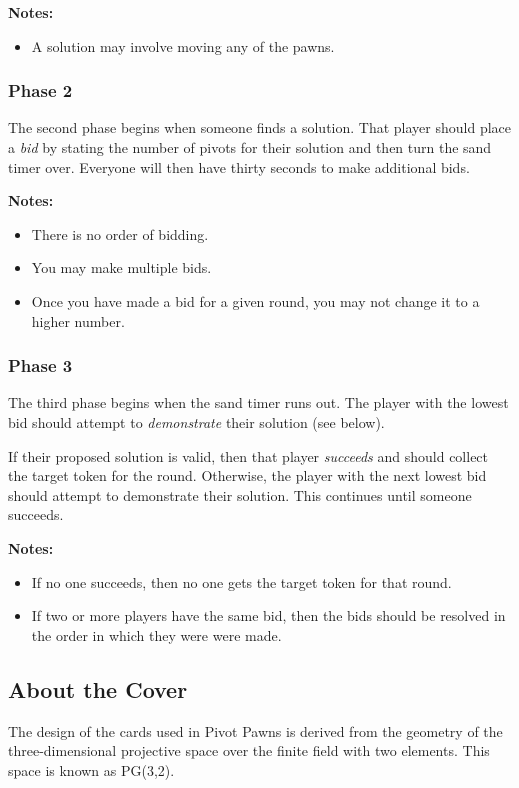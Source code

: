 \documentclass[a6paper, parskip=half, DIV=14, 10pt]{scrartcl}
\begin{document}
\textbf{Notes:}
\begin{itemize}[leftmargin=*]
  \item A solution may involve moving any of the pawns.
\end{itemize}

\subsubsection*{Phase 2}
The second phase begins when someone finds a solution.
That player should place a \emph{bid} by stating the number of pivots for their solution and then turn the sand timer over.
Everyone will then have thirty seconds to make additional bids.

\textbf{Notes:}
  \begin{itemize}[leftmargin=*]
    \item There is no order of bidding.
    \item You may make multiple bids.
    \item Once you have made a bid for a given round, you may not change it to a higher number.   
  \end{itemize}

\newpage

\subsubsection*{Phase 3}
The third phase begins when the sand timer runs out. The player with the lowest bid should attempt to \emph{demonstrate} their solution (see below).

If their proposed solution is valid, then that player \emph{succeeds} and should collect the target token for the round. Otherwise, the player with the next lowest bid should attempt to demonstrate their solution. This continues until someone succeeds.

\textbf{Notes:}
  \begin{itemize}[leftmargin=*]
  \item If no one succeeds, then no one gets the target token for that round.
  \item If two or more players have the same bid, then the bids should be resolved in the order in which they were were made.
  \end{itemize}

\vfill
\hrulefill
\subsection*{About the Cover}
The design of the cards used in Pivot Pawns is derived from the geometry of the three-dimensional projective space over the finite field with two elements. This space is known as PG(3,2). 
\end{document}
